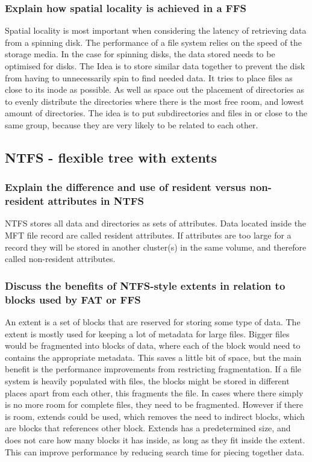 \documentclass[a4paper]{article}
\begin{document}
 
 
 \subsubsection{Explain how spatial locality is achieved in a FFS}
Spatial locality is most important when considering the latency of retrieving data from a spinning disk. The performance of a file system relies on the speed of the storage media. In the case for spinning disks, the data stored needs to be optimised for disks. The Idea is to store similar data together to prevent the disk from having to unnecessarily spin to find needed data. It tries to place files as close to its inode as possible. As well as space out the placement of directories as to evenly distribute the directories where there is the most free room, and lowest amount of directories. The idea is to put subdirectories and files in or close to the same group, because they are very likely to be related to each other. 


\subsection{NTFS - flexible tree with extents}

\subsubsection{Explain the difference and use of resident versus non-resident attributes in NTFS}
NTFS stores all data and directories as sets of attributes. Data located inside the MFT file record are called resident attributes. If attributes are too large for a record they will be stored in another cluster(s) in the same volume, and therefore called non-resident attributes. 


\subsubsection{Discuss the benefits of NTFS-style extents in relation to blocks used by FAT or FFS}

An extent is a set of blocks that are reserved for storing some type of data. The extent is mostly used for keeping a lot of metadata for large files. Bigger files would be fragmented into blocks of data, where each of the block would need to contains the appropriate metadata. This saves a little bit of space, but the main benefit is the performance improvements from restricting fragmentation. If a file system is heavily populated with files, the blocks might be stored in different places apart from each other, this fragments the file. In cases where there simply is no more room for complete files, they need to be fragmented. However if there is room, extends could be used, which removes the need to indirect blocks, which are blocks that references other block. Extends has a predetermined size, and does not care how many blocks it has inside, as long as they fit inside the extent. This can improve performance by reducing search time for piecing together data.
\end{document}
